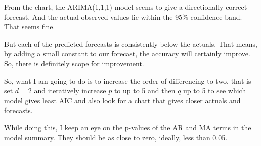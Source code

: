 \begin{center}
\end{center}
    
From the chart, the ARIMA(1,1,1) model seems to give a directionally
correct forecast. And the actual observed values lie within the 95\%
confidence band. That seems fine.

But each of the predicted forecasts is consistently below the actuals.
That means, by adding a small constant to our forecast, the accuracy
will certainly improve. So, there is definitely scope for improvement.

So, what I am going to do is to increase the order of differencing to
two, that is set \(d=2\) and iteratively increase \(p\) to up to 5 and
then \(q\) up to 5 to see which model gives least AIC and also look for
a chart that gives closer actuals and forecasts.

While doing this, I keep an eye on the p-values of the AR and MA terms
in the model summary. They should be as close to zero, ideally, less
than 0.05.

